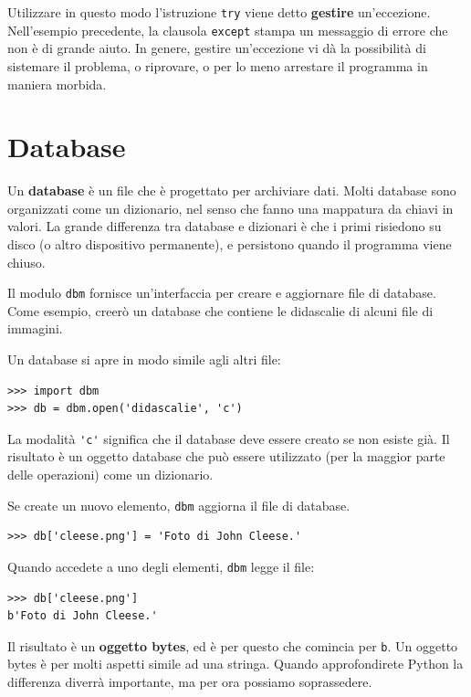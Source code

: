 \documentclass[10pt]{book}
\begin{document}
Utilizzare in questo modo l'istruzione {\tt try} viene detto {\bf
gestire} un'eccezione. Nell'esempio precedente, la clausola {\tt except} stampa un messaggio di errore che non è di grande aiuto. In genere, gestire un'eccezione vi dà la possibilità di sistemare il problema, o riprovare, o per lo meno arrestare il programma in maniera morbida.


\section{Database}

Un {\bf database} è un file che è progettato per archiviare dati. Molti database sono organizzati come un dizionario, nel senso che fanno una mappatura da chiavi in valori. La grande differenza tra database e dizionari è che i primi risiedono su disco (o altro dispositivo permanente), e persistono quando il programma viene chiuso.

Il modulo {\tt dbm} fornisce un'interfaccia per creare e aggiornare file di database. Come esempio, creerò un database che contiene le didascalie di alcuni file di immagini.

Un database si apre in modo simile agli altri file:

\begin{verbatim}
>>> import dbm
>>> db = dbm.open('didascalie', 'c')
\end{verbatim}
%
La modalità \verb"'c'" significa che il database deve essere creato se non esiste già. Il risultato è un oggetto database che può essere utilizzato (per la maggior parte delle operazioni) come un dizionario. 

Se create un nuovo elemento, {\tt dbm} aggiorna il file di database.


\begin{verbatim}
>>> db['cleese.png'] = 'Foto di John Cleese.'
\end{verbatim}
%
Quando accedete a uno degli elementi, {\tt dbm} legge il file:

\begin{verbatim}
>>> db['cleese.png']
b'Foto di John Cleese.'
\end{verbatim}
%
Il risultato è un {\bf oggetto bytes}, ed è per questo che comincia per {\tt b}.  Un oggetto bytes è per molti aspetti simile ad una stringa. Quando approfondirete Python la differenza diverrà importante, ma per ora possiamo soprassedere.
\end{document}
